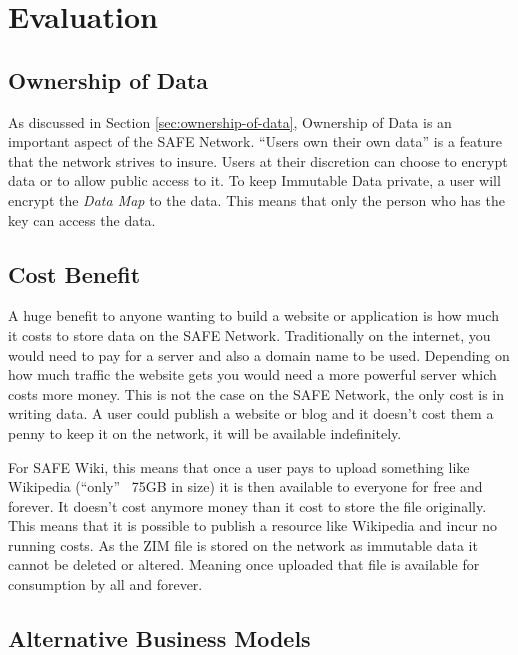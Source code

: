 \chapter{Evaluation}

\section{Ownership of Data}

As discussed in Section \ref{sec:ownership-of-data}, Ownership of Data is an important aspect of the SAFE Network. ``Users own their own data'' is a feature that the network strives to insure. Users at their discretion can choose to encrypt data or to allow public access to it. To keep Immutable Data private, a user will encrypt the \textit{Data Map} to the data. This means that only the person who has the key can access the data.

 \section{Cost Benefit}
 
 A huge benefit to anyone wanting to build a website or application is how much it costs to store data on the SAFE Network. Traditionally on the internet, you would need to pay for a server and also a domain name to be used. Depending on how much traffic the website gets you would need a more powerful server which costs more money. This is not the case on the SAFE Network, the only cost is in writing data. A user could publish a website or blog and it doesn't cost them a penny to keep it on the network, it will be available indefinitely.
 
 For SAFE Wiki, this means that once a user pays to upload something like Wikipedia (``only'' ~75GB in size) it is then available to everyone for free and forever. It doesn't cost anymore money than it cost to store the file originally. This means that it is possible to publish a resource like Wikipedia and incur no running costs. As the ZIM file is stored on the network as immutable data it cannot be deleted or altered. Meaning once uploaded that file is available for consumption by all and forever.
 
 \section{Alternative Business Models}

